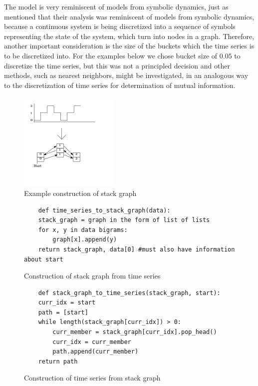 \documentclass[12pt]{article}
\begin{document}
The model is very reminiscent of models from symbolic dynamics, just as \cite{campanharo} mentioned that their analysis was reminiscent of models from symbolic dynamics, because a continuous system is being discretized into a sequence of symbols representing the state of the system, which turn into nodes in a graph. Therefore, another important consideration is the size of the buckets which the time series is to be discretized into. For the examples below we chose bucket size of $0.05$ to discretize the time series, but this was not a principled decision and other methods, such as nearest neighbors, might be investigated, in an analogous way to the discretization of time series for determination of mutual information\cite{nnmi}.

\begin{figure}
  \centering
  \includegraphics[scale=0.6]{stack_graph_ex}
  \caption{Example construction of stack graph}
  \label{fig:stackgraph}
\end{figure}

\begin{figure}
  \centering
  \begin{singlespace}
    \begin{verbatim}
    def time_series_to_stack_graph(data):
    stack_graph = graph in the form of list of lists
    for x, y in data bigrams:
        graph[x].append(y)
    return stack_graph, data[0] #must also have information about start
    \end{verbatim}
  \end{singlespace}
  \caption{Construction of stack graph from time series}
  \label{fig:stackconstructionalgo}
\end{figure}

\begin{figure}
  \centering
  \begin{singlespace}
    \begin{verbatim}
    def stack_graph_to_time_series(stack_graph, start):
    curr_idx = start
    path = [start]
    while length(stack_graph[curr_idx]) > 0:
        curr_member = stack_graph[curr_idx].pop_head()
        curr_idx = curr_member
        path.append(curr_member)
    return path
    \end{verbatim}
  \end{singlespace}
  \label{fig:timeconstructionalgo}
  \caption{Construction of time series from stack graph}
\end{figure}
\end{document}
